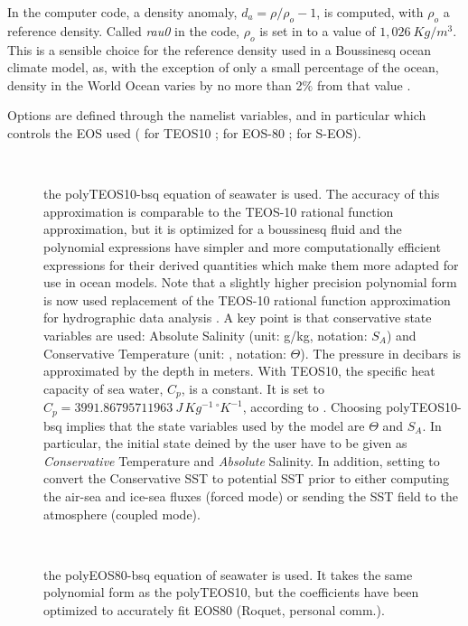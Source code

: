 \documentclass[../main/NEMO_manual]{subfiles}
\begin{document}
In the computer code, a density anomaly, $d_a = \rho / \rho_o - 1$, is computed, with $\rho_o$ a reference density.
Called \textit{rau0} in the code, $\rho_o$ is set in  to a value of $1,026~Kg/m^3$.
This is a sensible choice for the reference density used in a Boussinesq ocean climate model, as,
with the exception of only a small percentage of the ocean,
density in the World Ocean varies by no more than 2$\%$ from that value \citep{Gill1982}.

Options are defined through the  namelist variables, and in particular  which
controls the EOS used ( for TEOS10 ;  for EOS-80 ;  for S-EOS).

\begin{description}
\item[~]
  the polyTEOS10-bsq equation of seawater \citep{Roquet_OM2015} is used.
  The accuracy of this approximation is comparable to the TEOS-10 rational function approximation,
  but it is optimized for a boussinesq fluid and the polynomial expressions have simpler and
  more computationally efficient expressions for their derived quantities which make them more adapted for
  use in ocean models.
  Note that a slightly higher precision polynomial form is now used replacement of
  the TEOS-10 rational function approximation for hydrographic data analysis \citep{TEOS10}.
  A key point is that conservative state variables are used:
  Absolute Salinity (unit: g/kg, notation: $S_A$) and Conservative Temperature (unit: \degC, notation: $\Theta$).
  The pressure in decibars is approximated by the depth in meters.
  With TEOS10, the specific heat capacity of sea water, $C_p$, is a constant.
  It is set to $C_p = 3991.86795711963~J\,Kg^{-1}\,^{\circ}K^{-1}$, according to \citet{TEOS10}.
  Choosing polyTEOS10-bsq implies that the state variables used by the model are $\Theta$ and $S_A$.
  In particular, the initial state deined by the user have to be given as \textit{Conservative} Temperature and
  \textit{Absolute} Salinity.
  In addition, setting  to  convert the Conservative SST to potential SST prior to
  either computing the air-sea and ice-sea fluxes (forced mode) or
  sending the SST field to the atmosphere (coupled mode).
\item[~]
  the polyEOS80-bsq equation of seawater is used.
  It takes the same polynomial form as the polyTEOS10, but the coefficients have been optimized to
  accurately fit EOS80 (Roquet, personal comm.).

\end{description}
\end{document}
